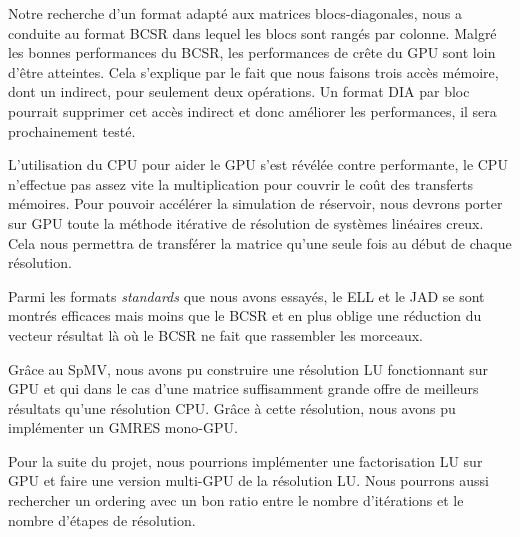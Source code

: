 \documentclass[a4paper,11pt]{report}
\begin{document}
 Notre recherche d'un format adapté aux matrices blocs-diagonales, nous
 a conduite au format BCSR dans lequel les blocs sont rangés par
 colonne. Malgré les bonnes performances du BCSR, les performances de
 crête du GPU sont loin d'être atteintes. Cela s'explique par le fait
 que nous faisons trois accès mémoire, dont un indirect, pour seulement deux
 opérations. Un format DIA par bloc pourrait supprimer cet accès
 indirect et donc améliorer les performances, il sera prochainement testé.

 L'utilisation du CPU pour aider le GPU s'est révélée
 contre performante, le CPU n'effectue pas assez vite la
 multiplication pour couvrir le coût des transferts mémoires.
 Pour pouvoir accélérer la
 simulation de réservoir, nous devrons porter sur GPU toute la méthode
 itérative de résolution de systèmes linéaires creux. Cela nous
 permettra de transférer la matrice qu'une seule fois au début de
 chaque résolution.

 Parmi les formats \textit{standards} que nous
 avons essayés, le ELL et le JAD se sont montrés efficaces mais moins
 que le BCSR et en plus oblige une réduction du vecteur résultat là où
 le BCSR ne fait que rassembler les morceaux.

 Grâce au SpMV, nous avons pu construire une résolution LU fonctionnant
 sur GPU et qui dans le cas d'une matrice suffisamment grande offre de
 meilleurs résultats qu'une résolution CPU. Grâce à cette résolution,
 nous avons pu implémenter un GMRES mono-GPU.

 Pour la suite du projet, nous pourrions implémenter une factorisation
 LU sur GPU et faire une version multi-GPU de la résolution LU. Nous
 pourrons aussi rechercher un ordering avec un bon ratio entre le nombre
 d'itérations et le nombre d'étapes de résolution.



\end{document}

